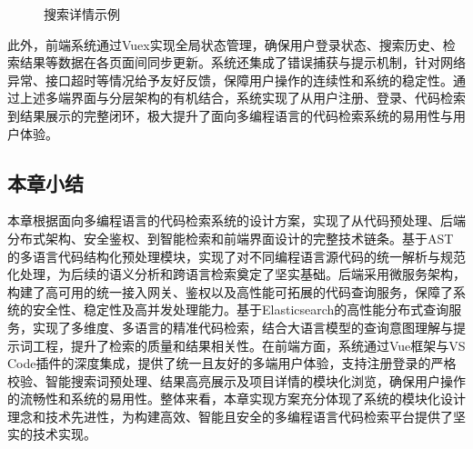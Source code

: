 \documentclass[UTF8,a4paper,12pt]{ctexart}
\numberwithin{equation}{section}
\begin{document}
\begin{figure}[H]
	\caption{搜索详情示例}
	\label{repodetailpage}
\end{figure}
此外，前端系统通过Vuex实现全局状态管理，确保用户登录状态、搜索历史、检索结果等数据在各页面间同步更新。系统还集成了错误捕获与提示机制，针对网络异常、接口超时等情况给予友好反馈，保障用户操作的连续性和系统的稳定性。通过上述多端界面与分层架构的有机结合，系统实现了从用户注册、登录、代码检索到结果展示的完整闭环，极大提升了面向多编程语言的代码检索系统的易用性与用户体验。\par
\subsection{本章小结}
本章根据面向多编程语言的代码检索系统的设计方案，实现了从代码预处理、后端分布式架构、安全鉴权、到智能检索和前端界面设计的完整技术链条。基于AST的多语言代码结构化预处理模块，实现了对不同编程语言源代码的统一解析与规范化处理，为后续的语义分析和跨语言检索奠定了坚实基础。后端采用微服务架构，构建了高可用的统一接入网关、鉴权以及高性能可拓展的代码查询服务，保障了系统的安全性、稳定性及高并发处理能力。基于Elasticsearch的高性能分布式查询服务，实现了多维度、多语言的精准代码检索，结合大语言模型的查询意图理解与提示词工程，提升了检索的质量和结果相关性。在前端方面，系统通过Vue框架与VS Code插件的深度集成，提供了统一且友好的多端用户体验，支持注册登录的严格校验、智能搜索词预处理、结果高亮展示及项目详情的模块化浏览，确保用户操作的流畅性和系统的易用性。整体来看，本章实现方案充分体现了系统的模块化设计理念和技术先进性，为构建高效、智能且安全的多编程语言代码检索平台提供了坚实的技术实现。\par
\end{document}
